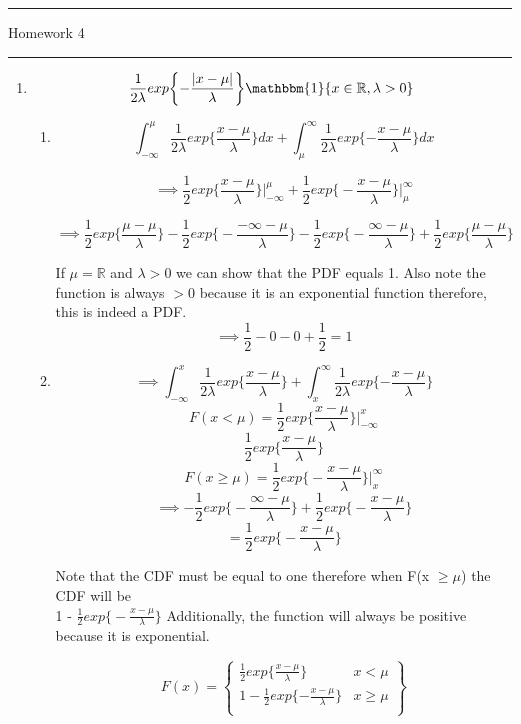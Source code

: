 \documentclass[letterpaper,12pt]{article}
\begin{document}
\thispagestyle{empty}

\hrule \vspace{0.5em}
 \hfill Homework 4 \newline \hrule
\begin{enumerate}
\item
\[
	\frac{1}{2\lambda} exp \bigg\{{-\frac{|x-\mu|}{\lambda}\bigg\}} \mathbbm{1}\{x \in \mathbb{R}, \lambda > 0\}
\]
\begin{enumerate}
\item
\[
\int_{-\infty}^{\mu}{\frac{1}{2\lambda} exp \bigg\{{\frac{x-\mu}{\lambda}\bigg\}}} dx + \int_{\mu}^{\infty}{\frac{1}{2\lambda} exp \bigg\{{-\frac{x-\mu}{\lambda}\bigg\}}} dx
\]

\[
	\implies \frac{1}{2}exp \bigg\{\frac{x-\mu}{\lambda}\bigg\} \bigg|_{-\infty}^{\mu} + \frac{1}{2}exp \bigg\{-\frac{x-\mu}{\lambda}\bigg\} \bigg|_{\mu}^{\infty}
\]

\[
	\implies \frac{1}{2}exp \bigg\{\frac{\mu-\mu}{\lambda}\bigg\} - \frac{1}{2}exp \bigg\{-\frac{-\infty-\mu}{\lambda}\bigg\} 
	-  \frac{1}{2}exp \bigg\{-\frac{\infty-\mu}{\lambda}\bigg\} +\frac{1}{2}exp \bigg\{\frac{\mu-\mu}{\lambda}\bigg\} 
\]

If $\mu = \mathbb{R}$ and $\lambda > 0$ we can show that the PDF equals 1. Also note the function is always $>0$ because it is an exponential function therefore, this is indeed a PDF.
\[
	\implies \frac{1}{2} - 0 - 0 + \frac{1}{2}  = 1
\]
\item
\[
	\implies \int_{-\infty}^{x}{\frac{1}{2\lambda} exp \bigg\{{\frac{x-\mu}{\lambda}\bigg\}}} + \int_{x}^{\infty}{\frac{1}{2\lambda} exp \bigg\{{-\frac{x-\mu}{\lambda}\bigg\}}}
\]
\[
	F(x < \mu) = \frac{1}{2}exp \bigg\{\frac{x-\mu}{\lambda}\bigg\} \bigg|_{-\infty}^{x}
\]
\[
	\frac{1}{2}exp \bigg\{\frac{x-\mu}{\lambda}\bigg\}
\]
\[
	 F(x\geq\mu) = \frac{1}{2}exp \bigg\{-\frac{x-\mu}{\lambda}\bigg\} \bigg|_{x}^{\infty}
\]
\[
	\implies -\frac{1}{2}exp \bigg\{-\frac{\infty-\mu}{\lambda}\bigg\} + \frac{1}{2}exp \bigg\{-\frac{x-\mu}{\lambda}\bigg\}
\]
\[
	= \frac{1}{2}exp \bigg\{-\frac{x-\mu}{\lambda}\bigg\}
\]

Note that the CDF must be equal to one therefore when F(x $\geq \mu$) the CDF will be \\
1 - $\frac{1}{2}exp \big\{-\frac{x-\mu}{\lambda}\big\}$
Additionally, the function will always be positive because it is exponential.

\[
	F(x)	= \left \{ \begin{array}{ll}
      \frac{1}{2}exp\big\{{\frac{x-\mu}{\lambda}}\big\} & x< \mu \\
      1- \frac{1}{2}exp\big\{{-\frac{x-\mu}{\lambda}}\big\} & x\geq \mu \\
	\end{array} \right \}
\]
\end{enumerate}
\newpage


\end{enumerate}
\end{document}
